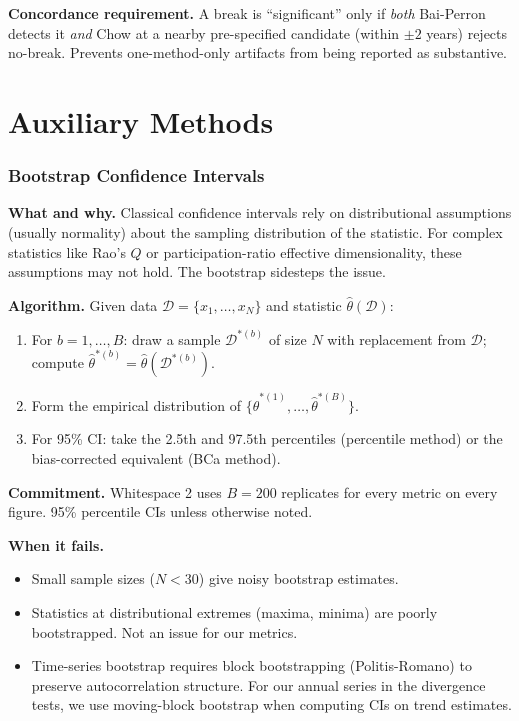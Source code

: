 \documentclass[11pt]{article}
\begin{document}
\textbf{Concordance requirement.} A break is ``significant'' only if
\textit{both} Bai-Perron detects it \textit{and} Chow at a nearby
pre-specified candidate (within $\pm 2$ years) rejects no-break.
Prevents one-method-only artifacts from being reported as substantive.

\clearpage
\part{Auxiliary Methods}

\section{Bootstrap Confidence Intervals}
\label{sec:bootstrap}

\textbf{What and why.} Classical confidence intervals rely on
distributional assumptions (usually normality) about the sampling
distribution of the statistic. For complex statistics like Rao's $Q$
or participation-ratio effective dimensionality, these assumptions
may not hold. The bootstrap sidesteps the issue.

\textbf{Algorithm.} Given data $\mathcal{D} = \{x_1, \ldots, x_N\}$ and
statistic $\hat\theta(\mathcal{D})$:
\begin{enumerate}[nosep]
  \item For $b = 1, \ldots, B$: draw a sample $\mathcal{D}^{*(b)}$ of
    size $N$ with replacement from $\mathcal{D}$; compute
    $\hat\theta^{*(b)} = \hat\theta(\mathcal{D}^{*(b)})$.
  \item Form the empirical distribution of
    $\{\hat\theta^{*(1)}, \ldots, \hat\theta^{*(B)}\}$.
  \item For 95\% CI: take the 2.5th and 97.5th percentiles (percentile
    method) or the bias-corrected equivalent (BCa method).
\end{enumerate}

\textbf{Commitment.} Whitespace 2 uses $B = 200$ replicates for every
metric on every figure. 95\% percentile CIs unless otherwise noted.

\textbf{When it fails.}
\begin{itemize}[nosep]
  \item Small sample sizes ($N < 30$) give noisy bootstrap estimates.
  \item Statistics at distributional extremes (maxima, minima) are
    poorly bootstrapped. Not an issue for our metrics.
  \item Time-series bootstrap requires block bootstrapping
    (Politis-Romano) to preserve autocorrelation structure. For our
    annual series in the divergence tests, we use moving-block
    bootstrap when computing CIs on trend estimates.
\end{itemize}
\end{document}

